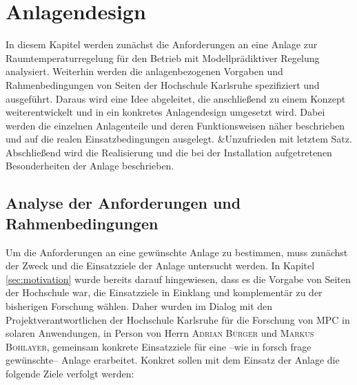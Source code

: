%
%

\renewcommand{\chapterheadstartvskip}{\vspace*{2cm}}

\chapter{Anlagendesign}
\label{chap:anlagendesign}

\renewcommand{\chapterheadstartvskip}{\vspace*{-0.5cm}}

In diesem Kapitel werden zunächst die Anforderungen an eine Anlage zur Raumtemperaturregelung für den Betrieb mit Modellprädiktiver Regelung analysiert. Weiterhin werden die anlagenbezogenen Vorgaben und Rahmenbedingungen von Seiten der Hochschule Karlsruhe spezifiziert und ausgeführt. Daraus wird eine Idee abgeleitet, die anschließend zu einem Konzept weiterentwickelt und in ein konkretes Anlagendesign umgesetzt wird. Dabei werden die einzelnen Anlagenteile und deren Funktionsweisen näher beschrieben und auf die realen Einsatzbedingungen ausgelegt. 
&Unzufrieden mit letztem Satz.
Abschließend wird die Realisierung und die bei der Installation aufgetretenen Besonderheiten der Anlage beschrieben.


\section{Analyse der Anforderungen und Rahmenbedingungen}
\label{sec:anforderungen}


Um die Anforderungen an eine gewünschte Anlage zu bestimmen, muss zunächst der Zweck und die Einsatzziele der Anlage untersucht werden. In Kapitel \ref{sec:motivation} wurde bereits darauf hingewiesen, dass es die Vorgabe von Seiten der Hochschule war, die Einsatzziele in Einklang und komplementär zu der bisherigen Forschung wählen. Daher wurden im Dialog mit den Projektverantwortlichen der Hochschule Karlsruhe für die Forschung von MPC in solaren Anwendungen, in Person von Herrn \textsc{Adrian Bürger} und \textsc{Markus Bohlayer}, gemeinsam konkrete Einsatzziele für eine --wie in forsch frage gewünschte-- Anlage erarbeitet. Konkret sollen mit dem Einsatz der Anlage die folgende Ziele verfolgt werden:
 

